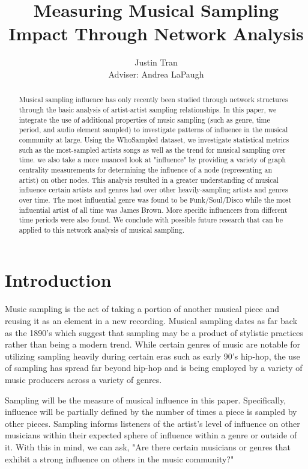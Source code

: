 \documentclass[pageno]{jpaper}
\begin{document}
\title{Measuring Musical Sampling Impact Through Network Analysis}

\author{Justin Tran\\Adviser: Andrea LaPaugh}

\date{}
\maketitle

\thispagestyle{empty}
\doublespacing
\begin{abstract}
Musical sampling influence has only recently been studied through network structures through the basic analysis of artist-artist sampling relationships. In this paper, we integrate the use of additional properties of music sampling (such as genre, time period, and audio element sampled) to investigate patterns of influence in the musical community at large. Using the WhoSampled dataset, we investigate statistical metrics such as the most-sampled artists songs as well as the trend for musical sampling over time. we also take a more nuanced look at "influence" by providing a variety of graph centrality measurements for determining the influence of a node (representing an artist) on other nodes. This analysis resulted in a greater understanding of musical influence certain artists and genres had over other heavily-sampling artists and genres over time. The most influential genre was found to be Funk/Soul/Disco while the most influential artist of all time was James Brown. More specific influencers from different time periods were also found. We conclude with possible future research that can be applied to this network analysis of musical sampling.
\end{abstract}

\section{Introduction}
Music sampling is the act of taking a portion of another musical piece and reusing it as an element in a new recording. Musical sampling dates as far back as the 1890’s which suggest that sampling may be a product of stylistic practices rather than being a modern trend. While certain genres of music are notable for utilizing sampling heavily during certain eras such as early 90’s hip-hop, the use of sampling has spread far beyond hip-hop and is being employed by a variety of music producers across a variety of genres.

Sampling will be the measure of musical influence in this paper. Specifically, influence will be partially defined by the number of times a piece is sampled by other pieces. Sampling informs listeners of the artist’s level of influence on other musicians within their expected sphere of influence within a genre or outside of it. With this in mind, we can ask, "Are there certain musicians or genres that exhibit a strong influence on others in the music community?" 
\end{document}
